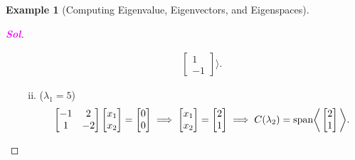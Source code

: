 \documentclass[12pt,openany]{book}
\theoremstyle{definition}
\newtheorem{example}{Example}[chapter]
\newcommand{\sol}{\textcolor{magenta}{\bf Sol}}
\begin{document}
\begin{example}[Computing Eigenvalue, Eigenvectors, and Eigenspaces]
\begin{proof}[\sol]
\begin{enumerate}[\bf (Step 1)]
\begin{enumerate}[(i)]
\begin{align*}
\begin{bmatrix}
		1\\-1
	\end{bmatrix}\bigg\rangle.
					\end{align*}
				\item (\(\lambda_1=5\))\begin{align*}
					\begin{bmatrix}
						-1&2\\1&-2
					\end{bmatrix}\begin{bmatrix}
						x_1\\x_2
					\end{bmatrix}=\begin{bmatrix}
						0\\0
					\end{bmatrix}\implies\begin{bmatrix}
						x_1\\x_2
					\end{bmatrix}=\begin{bmatrix}
						2\\1
					\end{bmatrix}\implies C(\lambda_2)=\textnormal{span}\bigg\langle\begin{bmatrix}
					2\\1
				\end{bmatrix}\bigg\rangle.
				\end{align*}
				\end{enumerate}
			\end{enumerate}
		\end{proof}
	\end{example}
\end{document}
